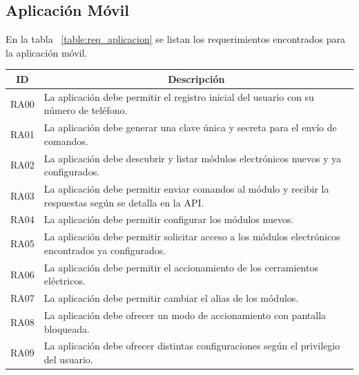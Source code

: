 \subsection{Aplicación Móvil}
En la tabla ~\ref{table:req_aplicacion} se listan los requerimientos encontrados para la aplicación móvil.
\begin{table}[ht]
	\centering
	\begin{tabular}{|l|m{12cm}|}
		\hline
		\multicolumn{1}{|c|}{\textbf{ID}} & \multicolumn{1}{c|}{\textbf{Descripción}}                                                                 \\ \hline
		RA00                              & La aplicación debe permitir el registro inicial del usuario con su número de teléfono.                    \\ \hline
		RA01                              & La aplicación debe generar una clave única y secreta para el envío de comandos.                           \\ \hline
		RA02                              & La aplicación debe descubrir y listar módulos electrónicos nuevos y ya configurados.                      \\ \hline
		RA03                              & La aplicación debe permitir enviar comandos al módulo y recibir la respuestas según se detalla en la API. \\ \hline
		RA04                              & La aplicación debe permitir configurar los módulos nuevos.                                                \\ \hline
		RA05                              & La aplicación debe permitir solicitar acceso a los módulos electrónicos encontrados ya configurados.      \\ \hline
		RA06                              & La aplicación debe permitir el accionamiento de los cerramientos eléctricos.                              \\ \hline
		RA07                              & La aplicación debe permitir cambiar el alias de los módulos.                                              \\ \hline
		RA08                              & La aplicación debe ofrecer un modo de accionamiento con pantalla bloqueada.                               \\ \hline
		RA09                              & La aplicación debe ofrecer distintas configuraciones según el privilegio del usuario.                     \\ \hline

\end{tabular}
\end{table}
